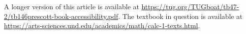 \documentclass{article}
\begin{document}

\hypersetup{hidelinks}%
A longer version of this article is available at
\url{https://tug.org/TUGboat/tb47-2/tb146prescott-book-accessibility.pdf}.
The textbook in question is available at
\url{https://arts-sciences.und.edu/academics/math/calc-1-texts.html}.
\end{document}

